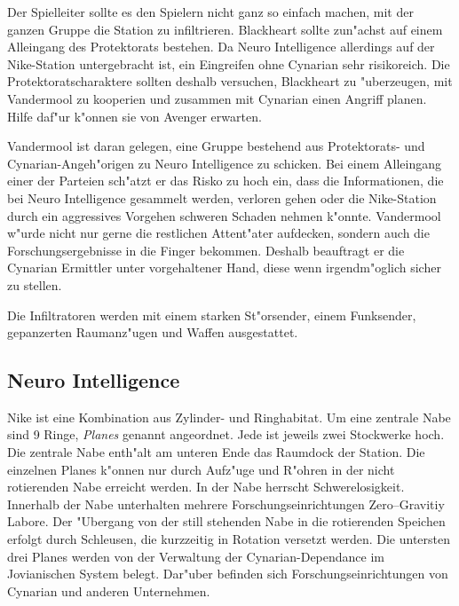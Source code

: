 \begin{remarks}
Der Spielleiter sollte es den Spielern nicht ganz so einfach machen, mit der ganzen Gruppe die Station zu infiltrieren. Blackheart sollte zun"achst auf einem Alleingang des Protektorats bestehen. Da Neuro Intelligence allerdings auf der Nike-Station untergebracht ist, ein Eingreifen ohne Cynarian sehr risikoreich. Die Protektoratscharaktere sollten deshalb versuchen, Blackheart zu "uberzeugen, mit Vandermool zu kooperien und zusammen mit Cynarian einen Angriff planen. Hilfe daf"ur k"onnen sie von Avenger erwarten.

Vandermool ist daran gelegen, eine Gruppe bestehend aus Protektorats- und Cynarian-Angeh"origen zu Neuro Intelligence zu schicken. Bei einem Alleingang einer der Parteien sch"atzt er das Risko zu hoch ein, dass die Informationen, die bei Neuro Intelligence gesammelt werden, verloren gehen oder die Nike-Station durch ein aggressives Vorgehen schweren Schaden nehmen k"onnte. Vandermool w"urde nicht nur gerne die restlichen Attent"ater aufdecken, sondern auch die Forschungsergebnisse in die Finger bekommen. Deshalb beauftragt er die Cynarian Ermittler unter vorgehaltener Hand, diese wenn irgendm"oglich sicher zu stellen.

Die Infiltratoren werden mit einem starken St"orsender, einem Funksender, gepanzerten Raumanz"ugen und Waffen ausgestattet.
\end{remarks}

\subsection{Neuro Intelligence}

Nike ist eine Kombination aus Zylinder- und Ringhabitat. Um eine zentrale Nabe sind 9 Ringe, \emph{Planes} genannt angeordnet. Jede ist jeweils zwei Stockwerke hoch. Die zentrale Nabe enth"alt am unteren Ende das Raumdock der Station.  Die einzelnen Planes k"onnen nur durch Aufz"uge und R"ohren in der nicht rotierenden Nabe erreicht werden. In der Nabe herrscht Schwerelosigkeit. Innerhalb der Nabe unterhalten mehrere Forschungseinrichtungen Zero--Gravitiy Labore. Der "Ubergang von der still stehenden Nabe in die rotierenden Speichen erfolgt durch Schleusen, die kurzzeitig in Rotation versetzt werden. Die untersten drei Planes werden von der Verwaltung der Cynarian-Dependance im Jovianischen System belegt. Dar"uber befinden sich Forschungseinrichtungen von Cynarian und anderen Unternehmen.


